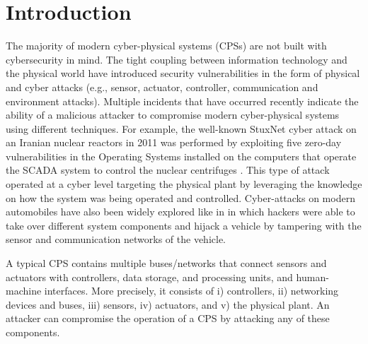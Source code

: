 \documentclass[letterpaper, 10 pt, conference]{ieeeconf}  %
\newcommand\NB[1]{$\spadesuit$\footnote{NB: #1}}
\begin{document}
\section{Introduction}
The majority of modern cyber-physical systems (CPSs) are not built with cybersecurity in mind. The tight coupling between information technology and the physical world have introduced security vulnerabilities in the form of physical and cyber attacks (e.g., sensor, actuator, controller, communication and environment attacks).
Multiple incidents that have occurred recently indicate the ability of a malicious attacker to compromise modern cyber-physical systems using different techniques. For example, the well-known StuxNet cyber attack on an Iranian nuclear reactors in 2011 was performed by exploiting five zero-day vulnerabilities in the Operating Systems installed on the computers that operate the SCADA system to control the nuclear centrifuges \cite{langner_2013}. This type of attack operated at a cyber level targeting the physical plant by leveraging the knowledge on how the system was being operated and controlled. Cyber-attacks on modern automobiles have also been widely explored like in \cite{miller} in which hackers were able to take over different system components and hijack a vehicle by tampering with the sensor and communication networks of the vehicle.

A typical CPS contains multiple buses/networks that connect sensors and actuators with controllers, data storage, and processing units, and human-machine interfaces. More precisely, it consists of i) controllers, ii) networking devices and buses, iii) sensors, iv) actuators, and v) the physical plant. An attacker can compromise the operation of a CPS by attacking any of these components. 
\end{document}
